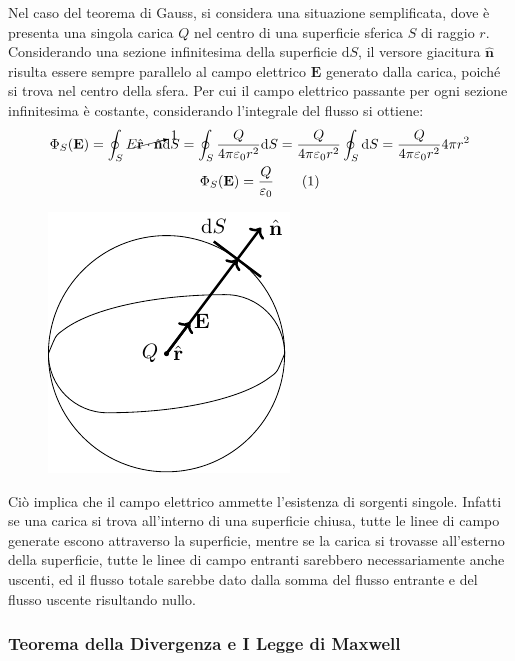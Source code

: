 \documentclass{article}
\newcommand{\vect}[1]{\boldsymbol{\mathbf{#1}}}
\newcommand{\df}{\mathrm{d}}
\newcommand{\tageq}{\tag{\stepcounter{equation}\theequation}}
\numberwithin{equation}{subsection}
\begin{document}
Nel caso del teorema di Gauss, si considera una situazione semplificata, dove è presenta una singola carica $Q$ nel centro di una superficie sferica $S$ di raggio $r$. 
Considerando una sezione infinitesima della superficie $\df S$, il versore giacitura $\hat{\vect{n}}$ risulta essere sempre parallelo al campo elettrico $\vect{E}$ generato dalla carica, 
poiché si trova nel centro della sfera. Per cui il campo elettrico passante per ogni sezione infinitesima è costante, considerando l'integrale del flusso si ottiene:
\begin{gather*}
    \Phi_S(\vect{E})=\displaystyle\oint_{S}E\cancelto{1}{\hat{\vect{r}}\cdot\hat{\vect{n}}}\df S=\oint_S\frac{Q}{4\pi\varepsilon_0r^2}\df S=\frac{Q}{4\pi\varepsilon_0r^2}\oint_S\df S=\frac{Q}{4\pi\varepsilon_0r^2}4\pi r^2\\
    \Phi_S(\vect{E})=\frac{Q}{\varepsilon_0}\tageq
\end{gather*}
\begin{figure}[H]%
    \centering
    \includegraphics{teorema-gauss.pdf}%
    \label{fig:teorema-gauss}
\end{figure}

Ciò implica che il campo elettrico ammette l'esistenza di sorgenti singole. Infatti se una carica si trova all'interno di una superficie chiusa, tutte le linee di campo generate 
escono attraverso la superficie, mentre se la carica si trovasse all'esterno della superficie, tutte le linee di campo entranti sarebbero necessariamente anche uscenti, ed il 
flusso totale sarebbe dato dalla somma del flusso entrante e del flusso uscente risultando nullo. 

\subsubsection{Teorema della Divergenza e I Legge di Maxwell}
\end{document}
